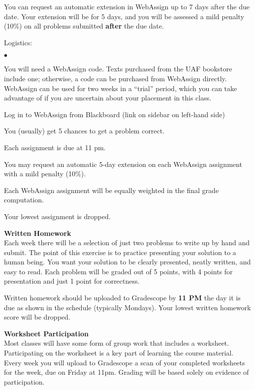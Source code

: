 \documentclass[12pt]{article}
\renewcommand{\emph}[1]{\textsf{\textbf{#1}}}
\newcommand{\localhead}[1]{\par\smallskip\textbf{#1}\nobreak\\}%
\def\heading#1{\localhead{\large\emph{#1}}}
\def\subheading#1{\localhead{\emph{#1}}}
\newenvironment{clist}%
{\bgroup\parskip 0pt\begin{list}{$\bullet$}{\partopsep 4pt\topsep 0pt\itemsep -2pt}}%
{\end{list}\egroup}%
\begin{document}
You can request an automatic extension in WebAssign up to 7 days after the due date. Your extension will be for 5 days, and you will be assessed a mild penalty (10\%) on all problems submitted \emph{after} the due date.

Logistics:

\begin{clist}
\item You will need a WebAssign code.  Texts purchased from the UAF 
bookstore include one; otherwise, a code can be purchased from
WebAssign directly. WebAssign can be used for two weeks in a ``trial''
period, which you can take advantage of if you are uncertain about
your placement in this class.
\item Log in to WebAssign from Blackboard (link on sidebar on left-hand side)
\item You (usually) get 5 chances to get a problem correct. 
\item Each assignment is due at 11 pm. 
\item You may request an automatic 5-day extension on each WebAssign assignment with a mild penalty (10\%).%
\item Each WebAssign assignment will be equally weighted in the final grade computation. 
\item Your lowest assignment is dropped.
\end{clist}


\subheading{Written Homework}
Each week there will be a selection of just two problems to write up
by hand and submit.  The point of this exercise is to 
practice presenting your solution to a human being.  You want
your solution to be clearly presented, neatly written, and easy to read.  Each problem will be graded out of 5 points,
with 4 points for presentation and just 1 point for correctness.

Written homework should be uploaded to Gradescope by {\bf 11 PM} the day
it is due as shown in the schedule (typically Mondays).  Your lowest written homework score will be dropped.

\heading{Worksheet Participation}

Most classes will have some form of group work that includes
a worksheet.  Participating on the worksheet is a key part
of learning the course material.  Every week you will upload to 
Gradescope a scan of your completed worksheets for the week,
due on Friday at 11pm.  Grading will be based solely on 
evidence of participation.
\end{document}
